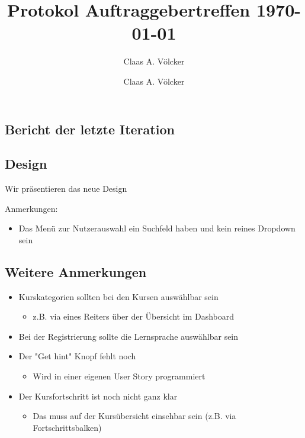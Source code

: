 \documentclass[colorback, accentcolor=tud1c, paper=a4]{tudexercise}
\title{Protokol Auftraggebertreffen \today}
\subtitle{Claas A. Völcker}
\author{Claas A. Völcker}
\begin{document}
	
\maketitle

\begin{multicols}{2}

\section{Bericht der letzte Iteration}
\subsection{Design}
Wir präsentieren das neue Design

Anmerkungen:
\begin{itemize}
\item Das Menü zur Nutzerauswahl ein Suchfeld haben und kein reines Dropdown sein
\end{itemize}

\subsection{Weitere Anmerkungen}
\begin{itemize}
\item Kurskategorien sollten bei den Kursen auswählbar sein
	\begin{itemize}
	\item z.B. via eines Reiters über der Übersicht im Dashboard
	\end{itemize}
\item Bei der Registrierung sollte die Lernsprache auswählbar sein
\item Der "Get hint" Knopf fehlt noch
	\begin{itemize}
	\item Wird in einer eigenen User Story programmiert
	\end{itemize}
\item Der Kursfortschritt ist noch nicht ganz klar
	\begin{itemize}
	\item Das muss auf der Kursübersicht einsehbar sein (z.B. via Fortschrittsbalken)
	\end{itemize}
\end{itemize}


\end{multicols}
\end{document}
